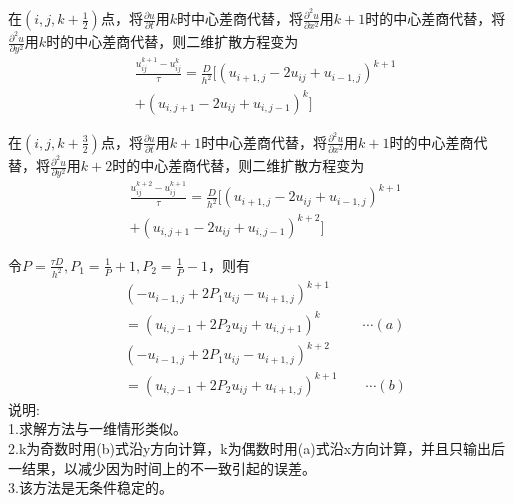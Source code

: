 \documentclass[twoside,twocolumn]{article}
\begin{document}
\begin{CJK*}{UTF8}{gkai}
在$(i,j,k+\frac{1}{2})$点，将$\frac{\partial u}{\partial t}$用$k$时中心差商代替，将$\frac{\partial^{2}u}{\partial x^{2}}$用$k+1$时的中心差商代替，将$\frac{\partial^{2} u}{\partial y^{2}}$用$k$时的中心差商代替，则二维扩散方程变为
\begin{equation*}
\begin{aligned}
&\frac{u_{ij}^{k+1}-u_{ij}^{k}}{\tau}=\frac{D}{h^{2}}[\left(u_{i+1,j}-2u_{ij}+u_{i-1,j}\right)^{k+1}\\
&+\left(u_{i,j+1}-2u_{ij}+u_{i,j-1}\right)^{k}]
\end{aligned}
\end{equation*}

在$(i,j,k+\frac{3}{2})$点，将$\frac{\partial u}{\partial t}$用$k+1$时中心差商代替，将$\frac{\partial^{2}u}{\partial x^{2}}$用$k+1$时的中心差商代替，将$\frac{\partial^{2} u}{\partial y^{2}}$用$k+2$时的中心差商代替，则二维扩散方程变为
\begin{equation*}
\begin{aligned}
&\frac{u_{ij}^{k+2}-u_{ij}^{k+1}}{\tau}=\frac{D}{h^{2}}[\left(u_{i+1,j}-2u_{ij}+u_{i-1,j}\right)^{k+1}\\
&+\left(u_{i,j+1}-2u_{ij}+u_{i,j-1}\right)^{k+2}]
\end{aligned}
\end{equation*}

令$P=\frac{\tau D}{h^{2}},P_{1}=\frac{1}{P}+1,P_{2}=\frac{1}{P}-1$，则有
\begin{equation*}
\begin{aligned}
&(-u_{i-1,j}+2P_{1}u_{ij}-u_{i+1,j})^{k+1}\\
&=(u_{i,j-1}+2P_{2}u_{ij}+u_{i,j+1})^{k}\qquad\quad \cdots (a)\\
&(-u_{i-1,j}+2P_{1}u_{ij}-u_{i+1,j})^{k+2}\\
&=(u_{i,j-1}+2P_{2}u_{ij}+u_{i+1,j})^{k+1}\qquad \cdots (b)
\end{aligned}
\end{equation*}
说明:\\
1.求解方法与一维情形类似。\\
2.k为奇数时用(b)式沿y方向计算，k为偶数时用(a)式沿x方向计算，并且只输出后一结果，以减少因为时间上的不一致引起的误差。\\
3.该方法是无条件稳定的。\\

\end{CJK*}
\end{document}
